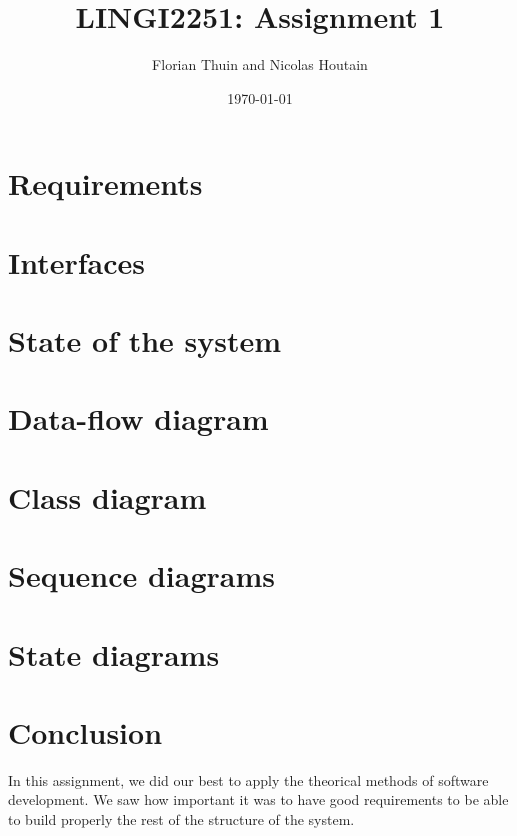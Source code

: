 \documentclass[11pt, a4paper]{article}
\title{LINGI2251: Assignment 1}
\author{Florian Thuin and Nicolas Houtain}
\date{\today}
\begin{document}
\maketitle
\tableofcontents

\section{Requirements}


\section{Interfaces}


\section{State of the system}



\section{Data-flow diagram}



\section{Class diagram}



\section{Sequence diagrams}



\section{State diagrams}


\section{Conclusion}

In this assignment, we did our best to apply the theorical methods of
software development. We saw how important it was to have good
requirements to be able to build properly the rest of the structure of
the system.
\end{document}
